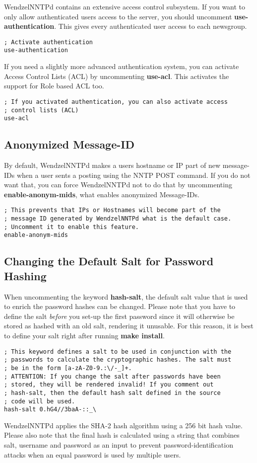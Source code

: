 WendzelNNTPd contains an extensive access control subsystem. If you want to only allow authenticated users access to the server, you should uncomment {\bf use-authentication}. This gives every authenticated user access to each newsgroup.

\begin{verbatim}
; Activate authentication
use-authentication
\end{verbatim}

If you need a slightly more advanced authentication system, you can activate Access Control Lists (ACL) by uncommenting {\bf use-acl}. This activates the support for Role based ACL too.

\begin{verbatim}
; If you activated authentication, you can also activate access
; control lists (ACL)
use-acl
\end{verbatim}

\subsection{Anonymized Message-ID}

By default, WendzelNNTPd makes a users hostname or IP part of new message-IDs when a user sents a posting using the NNTP POST command. If you do not want that, you can force WendzelNNTPd not to do that by uncommenting {\bf enable-anonym-mids}, what enables anonymized Message-IDs.

\begin{verbatim}
; This prevents that IPs or Hostnames will become part of the
; message ID generated by WendzelNNTPd what is the default case.
; Uncomment it to enable this feature.
enable-anonym-mids
\end{verbatim}

\subsection{Changing the Default Salt for Password Hashing}

When uncommenting the keyword {\bf hash-salt}, the default salt value that is used to enrich the password hashes can be changed. Please note that you have to define the salt {\it before} you set-up the first password since it will otherwise be stored as hashed with an old salt, rendering it unusable. For this reason, it is best to define your salt right after running {\bf make install}.

\begin{verbatim}
; This keyword defines a salt to be used in conjunction with the
; passwords to calculate the cryptographic hashes. The salt must
; be in the form [a-zA-Z0-9.:\/-_]+.
; ATTENTION: If you change the salt after passwords have been
; stored, they will be rendered invalid! If you comment out
; hash-salt, then the default hash salt defined in the source
; code will be used.
hash-salt 0.hG4//3baA-::_\
\end{verbatim}

WendzelNNTPd applies the SHA-2 hash algorithm using a 256 bit hash value. Please also note that the final hash is calculated using a string that combines salt, username and password as an input to prevent password-identification attacks when an equal password is used by multiple users.


